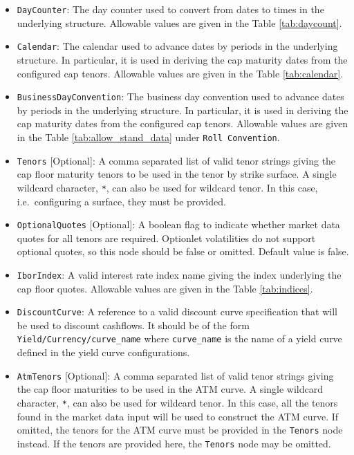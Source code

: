 \begin{itemize}
\item \lstinline!DayCounter!:
The day counter used to convert from dates to times in the underlying structure. Allowable values are given in the Table \ref{tab:daycount}.

\item \lstinline!Calendar!:
The calendar used to advance dates by periods in the underlying structure. In particular, it is used in deriving the cap maturity dates from the configured cap tenors. Allowable values are given in the Table \ref{tab:calendar}.

\item \lstinline!BusinessDayConvention!:
The business day convention used to advance dates by periods in the underlying structure. In particular, it is used in deriving the cap maturity dates from the configured cap tenors. Allowable values are given in the Table \ref{tab:allow_stand_data} under \lstinline!Roll Convention!.

\item \lstinline!Tenors! [Optional]:
A comma separated list of valid tenor strings giving the cap floor maturity tenors to be used in the tenor by strike surface. A single wildcard character, \lstinline!*!, can also be used for wildcard tenor. In this case, i.e.\ configuring a surface, they must be provided.

\item \lstinline!OptionalQuotes! [Optional]:
A boolean flag to indicate whether market data quotes for all tenors are required. Optionlet volatilities do not support optional quotes, so this node should be false or omitted. Default value is false.

\item \lstinline!IborIndex!:
A valid interest rate index name giving the index underlying the cap floor quotes. Allowable values are given in the Table \ref{tab:indices}.

\item \lstinline!DiscountCurve!:
A reference to a valid discount curve specification that will be used to discount cashflows. It should be of the form \lstinline!Yield/Currency/curve_name! where \lstinline!curve_name! is the name of a yield curve defined in the yield curve configurations.

\item \lstinline!AtmTenors! [Optional]:
A comma separated list of valid tenor strings giving the cap floor maturities to be used in the ATM curve. A single wildcard character, \lstinline!*!, can also be used for wildcard tenor. In this case, all the tenors found in the market data input will be used to construct the ATM curve. If omitted, the tenors for the ATM curve must be provided in the \lstinline!Tenors! node instead. If the tenors are provided here, the \lstinline!Tenors! node may be omitted.


\end{itemize}
